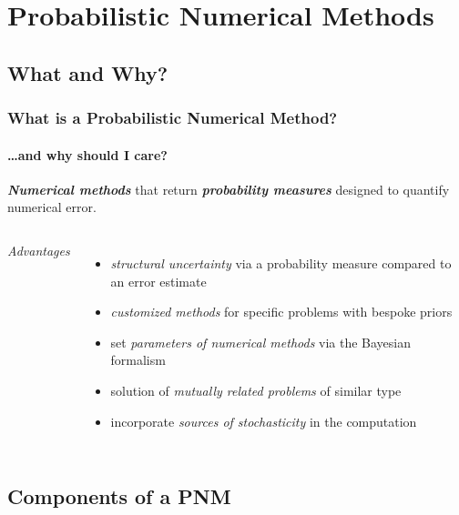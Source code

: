 \documentclass[10pt,usepdftitle=false,aspectratio=169]{beamer}
\begin{document}
\section{Probabilistic Numerical Methods}

\subsection{What and Why?}

\begin{frame}\frametitle{What is a Probabilistic Numerical Method?}
	\framesubtitle{\dots and why should I care?}

	\emph{\bf Numerical methods} that return \emph{\bf probability measures} designed to quantify numerical error.

	\vspace{2em}

	\begin{columns}


		\emph{Advantages}
		\begin{itemize}
			\item \textit{structural uncertainty} via a probability measure compared to an error estimate
			\item \textit{customized methods} for specific problems with bespoke priors
			\item set \textit{parameters of numerical methods} via the Bayesian formalism
			\item solution of \textit{mutually related problems} of similar type
			\item incorporate \textit{sources of stochasticity} in the computation
		\end{itemize}


	\end{columns}

	\vfill


\end{frame}

\subsection{Components of a PNM}
\end{document}

